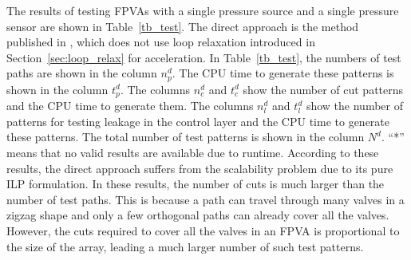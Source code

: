 \documentclass[journal,twoside]{IEEEtran}
\begin{document}
The results of testing FPVAs with a single pressure source and a single pressure sensor
are shown in Table~\ref{tb_test}.
The direct approach is the method published in \cite{CBBK17}, which
does not use loop relaxation introduced in Section~\ref{sec:loop_relax} for
acceleration. In Table~\ref{tb_test}, the
numbers of test paths are shown in the column $n^d_p$. The CPU time to
generate these patterns is shown in the column $t^d_p$. The columns $n^d_c$ and
$t^d_c$ show the number of cut patterns and the CPU time to generate them.
The columns $n^d_l$ and $t_l^d$ show the number of patterns for testing leakage in the
control layer and the CPU time to generate these patterns. The
total number of test patterns is shown in the column $N^d$. 
``*'' means that no valid results are available 
due to runtime.
According to these results, the direct approach suffers from the scalability problem
due to its pure ILP formulation.
In these results, the number of cuts is much larger than the number of test
paths. This is because a path can travel through many valves in a zigzag shape and 
only a few orthogonal paths can already cover all the valves.
However, the cuts required to cover all the valves in an
FPVA is proportional to the size of the array, leading a much larger number of
such test patterns.
\end{document}
